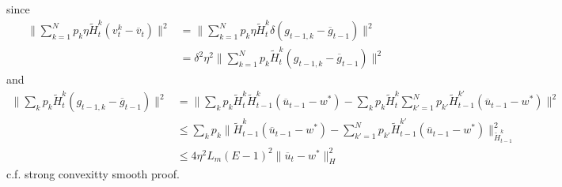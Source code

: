 {} since 
\begin{align*}
\|\sum_{k=1}^{N}p_{k}\eta\tilde{H}_{t}^{k}(v_{t}^{k}-\overline{v}_{t})\|^{2} & =\|\sum_{k=1}^{N}p_{k}\eta\tilde{H}_{t}^{k}\delta(g_{t-1,k}-\overline{g}_{t-1})\|^{2}\\
& =\delta^{2}\eta^{2}\|\sum_{k=1}^{N}p_{k}\tilde{H}_{t}^{k}(g_{t-1,k}-\overline{g}_{t-1})\|^{2}
\end{align*}
and 
\begin{align*}
\|\sum_{k}p_{k}\tilde{H}_{t}^{k}(g_{t-1,k}-\overline{g}_{t-1})\|^{2} & =\|\sum_{k}p_{k}\tilde{H}_{t}^{k}\tilde{H}_{t-1}^{k}(\overline{u}_{t-1}-w^{\ast})-\sum_{k}p_{k}\tilde{H}_{t}^{k}\sum_{k'=1}^{N}p_{k'}\tilde{H}_{t-1}^{k'}(\overline{u}_{t-1}-w^{\ast})\|^{2}\\
& \leq\sum_{k}p_{k}\|\tilde{H}_{t-1}^{k}(\overline{u}_{t-1}-w^{\ast})-\sum_{k'=1}^{N}p_{k'}\tilde{H}_{t-1}^{k'}(\overline{u}_{t-1}-w^{\ast})\|_{\tilde{H}_{t-1}^{k}}^{2}\\
& \leq4\eta^{2}L_{m}(E-1)^{2}\|\overline{u}_{t}-w^{\ast}\|_{H}^{2}
\end{align*}
c.f. strong convexitty smooth proof. 

